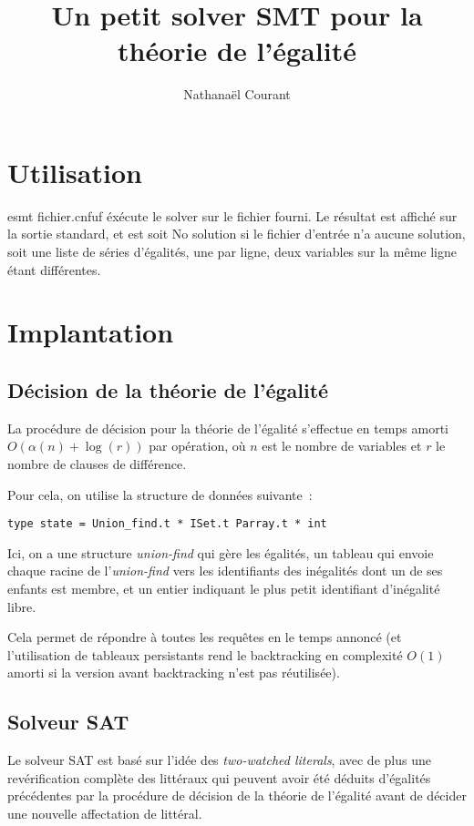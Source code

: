 \documentclass[a4paper,10pt]{article}
\title{Un petit solver SMT pour la théorie de l'égalité}
\author{Nathanaël Courant}
\newcommand{\code}[1]{{\fontfamily{pcr}\selectfont #1}}
\begin{document}
\maketitle

\section{Utilisation}

\code{esmt fichier.cnfuf} éxécute le solver sur le fichier fourni. Le
résultat est affiché sur la sortie standard, et est soit \code{No
  solution} si le fichier d'entrée n'a aucune solution, soit une liste
de séries d'égalités, une par ligne, deux variables sur la même ligne
étant différentes.

\section{Implantation}

\subsection{Décision de la théorie de l'égalité}

La procédure de décision pour la théorie de l'égalité s'effectue en
temps amorti $O(\alpha (n) + \log (r))$ par opération, où $n$ est le
nombre de variables et $r$ le nombre de clauses de différence.

Pour cela, on utilise la structure de données suivante~:
\begin{lstlisting}
type state = Union_find.t * ISet.t Parray.t * int
\end{lstlisting}

Ici, on a une structure \textit{union-find} qui gère les égalités, un
tableau qui envoie chaque racine de l'\textit{union-find} vers les
identifiants des inégalités dont un de ses enfants est
membre, et un entier indiquant le plus petit identifiant d'inégalité
libre.

Cela permet de répondre à toutes les requêtes en le temps annoncé (et
l'utilisation de tableaux persistants rend le backtracking en
complexité $O(1)$ amorti si la version avant backtracking n'est pas
réutilisée).

\subsection{Solveur SAT}

Le solveur SAT est basé sur l'idée des \textit{two-watched literals},
avec de plus une revérification complète des littéraux qui peuvent
avoir été déduits d'égalités précédentes par la procédure de décision
de la théorie de l'égalité avant de décider une nouvelle affectation
de littéral.
\end{document}
